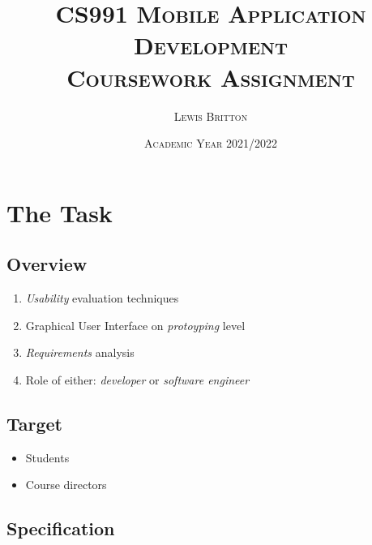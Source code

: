 \documentclass[11pt, english]{article}
\begin{document}

	\title{\textsc{CS991 Mobile Application Development\\ Coursework Assignment}}
	\author{\textsc{Lewis Britton}}
	\date{\textsc{Academic Year 2021/2022}}
        \maketitle

\newpage


	\renewcommand{\contentsname}{Table of Contents}

	\tableofcontents

\newpage


\section*{The Task}

	\subsection*{Overview}

	\begin{enumerate}
	\setlength\itemsep{0cm}
		\item \textit{Usability} evaluation techniques
		\item Graphical User Interface on \textit{protoyping} level
		\item \textit{Requirements} analysis
		\item Role of either: \textit{developer} or \textit{software engineer}
	\end{enumerate}

	\subsection*{Target}

	\begin{itemize}
	\setlength\itemsep{0cm}
		\item Students
		\item Course directors
	\end{itemize}

	\subsection*{Specification}
\end{document}
